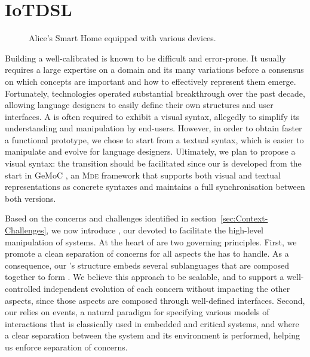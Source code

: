 \section{IoTDSL}
\label{sec:IoTDSL}

\begin{figure*}%
\caption{Alice's Smart Home equipped with various devices.}%
\label{fig:RE}%
\end{figure*}

Building a well-calibrated \DSL is known to be difficult and error-prone. It usually requires a large expertise on a domain and its many variations before a consensus on which concepts are important and how to effectively represent them emerge. Fortunately, \MDE technologies operated substantial breakthrough over the past decade, allowing language designers to easily define their own \DSL structures and user interfaces. A \DSL is often required to exhibit a visual syntax, allegedly to simplify its understanding and manipulation by end-users. However, in order to obtain faster a functional prototype, we chose to start from a textual syntax, which is easier to manipulate and evolve for language designers. Ultimately, we plan to propose a visual syntax: the transition should be facilitated since our \DSL is developed from the start in GeMoC \cite{combemale-14}, an \textsc{Mde} framework that supports both visual and textual representations as concrete syntaxes and maintains a full synchronisation between both versions.



Based on the concerns and challenges identified in section~\ref{sec:Context-Challenges}, we now introduce \IOTDSL, our \DSL devoted to facilitate the high-level manipulation of \IOT systems. At the heart of \IOTDSL are two governing principles. First, we promote a clean separation of concerns for all aspects the \DSL has to handle. As a consequence, our \DSL's structure embeds several sublanguages that are composed together to form \IOTDSL. We believe this approach to be scalable, and to support a well-controlled independent evolution of each concern without impacting the other aspects, since those aspects are composed through well-defined interfaces. Second, our \DSL relies on events, a natural paradigm for specifying various models of interactions that is classically used in embedded and critical systems, and where a clear separation between the system and its environment is performed, helping us enforce separation of concerns.



